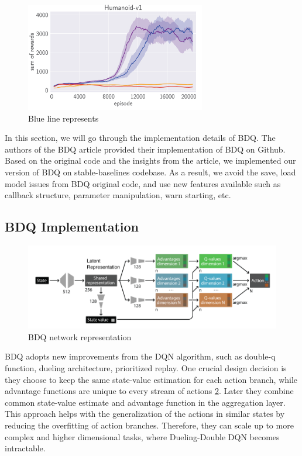 \begin{figure}[htbp] 
    \centering
    \includegraphics[width=0.7\textwidth]{figures/BDQvsDDPG}
    \caption{Blue line represents }
    \label{fig:bdqvsddpg}
\end{figure}

In this section, we will go through the implementation details of BDQ. The authors of the BDQ article provided their implementation of BDQ on Github. Based on the original code and the insights from the article, we implemented our version of BDQ on stable-baselines codebase. As a result, we avoid the save, load model issues from BDQ original code, and use new features available such as callback structure, parameter manipulation, warn starting, etc. 


\subsection{BDQ Implementation}


\begin{figure}[htbp] 
    \centering
    \includegraphics[width=1.0\textwidth]{figures/bdq_network.png}
    \caption{BDQ network representation}
    \label{fig:bdq_net}
\end{figure}

BDQ adopts new improvements from the DQN algorithm, such as double-q function, dueling architecture, prioritized replay. One crucial design decision is they choose to keep the same state-value estimation for each action branch, while advantage functions are unique to every stream of actions \ref{fig:bdq_net}. Later they combine common state-value estimate and advantage function in the aggregation layer. This approach helps with the generalization of the actions in similar states by reducing the overfitting of action branches. Therefore, they can scale up to more complex and higher dimensional tasks, where Dueling-Double DQN becomes intractable.

